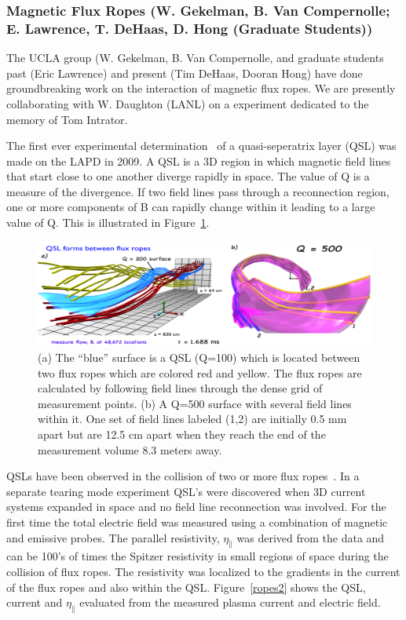 \documentclass[11pt]{article}
\renewcommand{\cite}{\citep}
\begin{document}
\subsubsection{Magnetic Flux Ropes (W. Gekelman, B. Van Compernolle; E.
Lawrence, T. DeHaas, D. Hong (Graduate Students))}

The UCLA group (W. Gekelman, B. Van Compernolle, and graduate students
past (Eric Lawrence) and present (Tim DeHaas, Dooran Hong) have done
groundbreaking work on the interaction of magnetic flux ropes. We are
presently collaborating with W. Daughton (LANL) on a experiment
dedicated to the memory of Tom Intrator.

The first ever experimental
determination~\cite{lawrence:2009} of a quasi-seperatrix layer
(QSL) was made on the LAPD in 2009. A QSL is a 3D region in which
magnetic field lines that start close to one another diverge rapidly in
space. The value of Q is a measure of the divergence. If two field lines
pass through a reconnection region, one or more components of B can
rapidly change within it leading to a large value of Q. This is
illustrated in Figure~\ref{ropes1}.

\begin{figure}[!htbp]
\centerline{\includegraphics[width=5.0truein]{ropes1}}
\caption{(a) The ``blue'' surface is a QSL (Q=100) which is located
between two flux ropes which are colored red and yellow. The flux ropes
are calculated by following field lines through the dense grid of
measurement points. (b) A Q=500 surface with several field lines
within it. One set of field lines labeled (1,2) are initially 0.5 mm
apart but are 12.5 cm apart when they reach the end of the measurement
volume 8.3 meters away.}\label{ropes1}
\end{figure}

QSLs have been observed in the collision of two or more flux
ropes~\cite{gekelman:2010,vancompernolle:2011}. In a separate tearing mode experiment QSL's
were discovered when 3D current systems expanded in space and no field
line reconnection was involved. For the first time the total electric
field was measured using a
combination of magnetic and emissive probes. The parallel resistivity,
$\eta_\parallel$ was derived from the data and can
be 100's of times the Spitzer resistivity in small regions of space
during the collision of flux ropes. The resistivity was localized to the
gradients in the current of the flux ropes and also within the QSL.
Figure~\ref{ropes2} shows the QSL, current and $\eta_\parallel$
evaluated from the measured plasma current and electric field.
\end{document}
